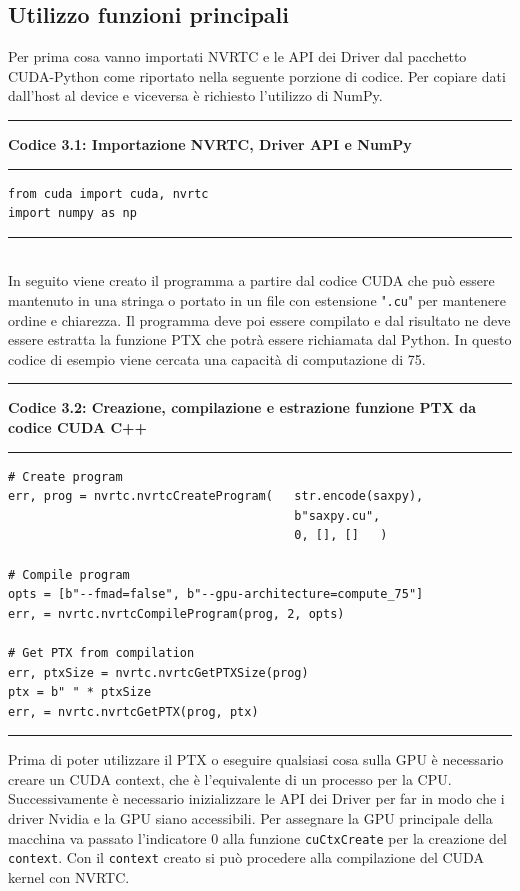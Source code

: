 \documentclass[12pt,a4paper]{report}
\begin{document}
\subsection{Utilizzo funzioni principali}
Per prima cosa vanno importati NVRTC e le API dei Driver dal pacchetto CUDA-Python come riportato nella seguente porzione di codice. Per copiare dati dall'host al device e viceversa è richiesto l'utilizzo di NumPy. \\[10pt]
\noindent\rule[0.5ex]{\linewidth}{2pt}
\small{\textbf{Codice 3.1: Importazione NVRTC, Driver API e NumPy}} \\
\noindent\rule[0.5ex]{\linewidth}{1pt}
\begin{lstlisting}
from cuda import cuda, nvrtc
import numpy as np
\end{lstlisting}
\noindent\rule[0.5ex]{\linewidth}{1pt} \\[10pt]
In seguito viene creato il programma a partire dal codice CUDA che può essere mantenuto in una stringa o portato in un file con estensione "\verb|.cu|" per mantenere ordine e chiarezza. Il programma deve poi essere compilato e dal risultato ne deve essere estratta la funzione PTX che potrà essere richiamata dal Python. In questo codice di esempio viene cercata una capacità di computazione di 75.   \\[10pt]
\noindent\rule[0.5ex]{\linewidth}{2pt}
\small{\textbf{Codice 3.2: Creazione, compilazione e estrazione funzione PTX da codice CUDA C++}} \\
\noindent\rule[0.5ex]{\linewidth}{1pt}
\begin{lstlisting}
# Create program
err, prog = nvrtc.nvrtcCreateProgram(   str.encode(saxpy), 
                                        b"saxpy.cu", 
                                        0, [], []   )

# Compile program 
opts = [b"--fmad=false", b"--gpu-architecture=compute_75"]
err, = nvrtc.nvrtcCompileProgram(prog, 2, opts)

# Get PTX from compilation
err, ptxSize = nvrtc.nvrtcGetPTXSize(prog)
ptx = b" " * ptxSize
err, = nvrtc.nvrtcGetPTX(prog, ptx)
\end{lstlisting}
\noindent\rule[0.5ex]{\linewidth}{1pt} \newpage
Prima di poter utilizzare il PTX o eseguire qualsiasi cosa sulla GPU è necessario creare un CUDA context, che è l'equivalente di un processo per la CPU. \newline
Successivamente è necessario inizializzare le API dei Driver per far in modo che i driver Nvidia e la GPU siano accessibili. Per assegnare la GPU principale della macchina va passato l'indicatore 0 alla funzione \verb|cuCtxCreate| per la creazione del \verb|context|. Con il \verb|context| creato si può procedere alla compilazione del CUDA kernel con NVRTC. \\[10pt]
\end{document}
